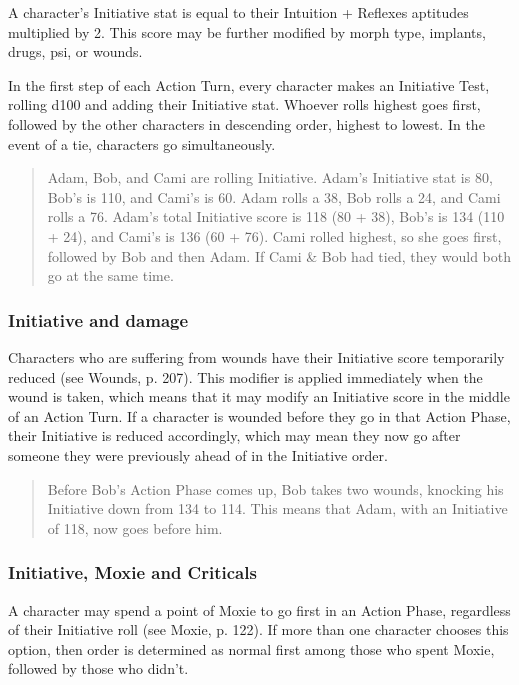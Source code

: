 A character’s Initiative stat is equal to their Intuition + Reflexes aptitudes multiplied by 2. This score may be further modified by morph type, implants, drugs, psi, or wounds.

In the first step of each Action Turn, every character makes an Initiative Test, rolling d100 and adding their Initiative stat. Whoever rolls highest goes first, followed by the other characters in descending order, highest to lowest. In the event of a tie, characters go simultaneously.

\begin{quotation}
Adam, Bob, and Cami are rolling Initiative. Adam’s Initiative stat is 80, Bob’s is 110, and Cami’s is 60. Adam rolls a 38, Bob rolls a 24, and Cami rolls a 76. Adam’s total Initiative score is 118 (80 + 38), Bob’s is 134 (110 + 24), and Cami’s is 136 (60 + 76). Cami rolled highest, so she goes first, followed by Bob and then Adam. If Cami \& Bob had tied, they would both go at the same time.
\end{quotation}

\subsubsection{Initiative and damage}

Characters who are suffering from wounds have their Initiative score temporarily reduced (see Wounds, p. 207). This modifier is applied immediately when the wound is taken, which means that it may modify an Initiative score in the middle of an Action Turn. If a character is wounded before they go in that Action Phase, their Initiative is reduced accordingly, which may mean they now go after someone they were previously ahead of in the Initiative order.

\begin{quotation}
Before Bob’s Action Phase comes up, Bob takes two wounds, knocking his Initiative down from 134 to 114. This means that Adam, with an Initiative of 118, now goes before him.
\end{quotation}

\subsubsection{Initiative, Moxie and Criticals}

A character may spend a point of Moxie to go first in an Action Phase, regardless of their Initiative roll (see Moxie, p. 122). If more than one character chooses this option, then order is determined as normal first among those who spent Moxie, followed by those who didn’t.

